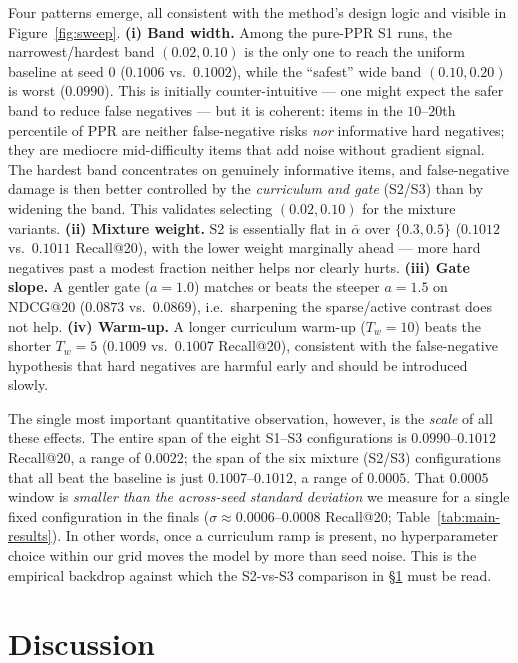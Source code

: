 \documentclass{article}
\begin{document}
Four patterns emerge, all consistent with the method's design logic and visible in
Figure~\ref{fig:sweep}. \textbf{(i) Band width.} Among the pure-PPR S1 runs, the
narrowest/hardest band $(0.02,0.10)$ is the only one to reach the uniform baseline at
seed $0$ ($0.1006$ vs.\ $0.1002$), while the ``safest'' wide band $(0.10,0.20)$ is worst
($0.0990$). This is initially counter-intuitive --- one might expect the safer band to
reduce false negatives --- but it is coherent: items in the $10$--$20$th percentile of
PPR are neither false-negative risks \emph{nor} informative hard negatives; they are
mediocre mid-difficulty items that add noise without gradient signal. The hardest band
concentrates on genuinely informative items, and false-negative damage is then better
controlled by the \emph{curriculum and gate} (S2/S3) than by widening the band. This
validates selecting $(0.02,0.10)$ for the mixture variants. \textbf{(ii) Mixture
weight.} S2 is essentially flat in $\bar\alpha$ over $\{0.3,0.5\}$ ($0.1012$ vs.\
$0.1011$ Recall@20), with the lower weight marginally ahead --- more hard negatives
past a modest fraction neither helps nor clearly hurts. \textbf{(iii) Gate slope.} A
gentler gate ($a{=}1.0$) matches or beats the steeper $a{=}1.5$ on NDCG@20 ($0.0873$
vs.\ $0.0869$), i.e.\ sharpening the sparse/active contrast does not help.
\textbf{(iv) Warm-up.} A longer curriculum warm-up ($T_w{=}10$) beats the shorter
$T_w{=}5$ ($0.1009$ vs.\ $0.1007$ Recall@20), consistent with the false-negative
hypothesis that hard negatives are harmful early and should be introduced slowly.

The single most important quantitative observation, however, is the \emph{scale} of
all these effects. The entire span of the eight S1--S3 configurations is
$0.0990$--$0.1012$ Recall@20, a range of $0.0022$; the span of the six mixture
(S2/S3) configurations that all beat the baseline is just $0.1007$--$0.1012$, a
range of $0.0005$. That $0.0005$ window is \emph{smaller than the across-seed
standard deviation} we measure for a single fixed configuration in the finals
($\sigma\!\approx\!0.0006$--$0.0008$ Recall@20; Table~\ref{tab:main-results}). In
other words, once a curriculum ramp is present, no hyperparameter choice within our
grid moves the model by more than seed noise. This is the empirical backdrop
against which the S2-vs-S3 comparison in \S\ref{sec:discussion} must be read.

\section{Discussion}
\label{sec:discussion}
\end{document}

